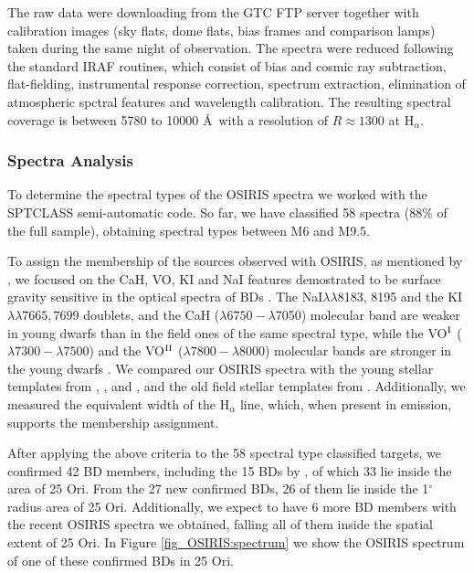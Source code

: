 \documentclass[12pt]{article}
\newcounter{subsubsubsection}[subsubsection]
\begin{document}
\label{sec_OSIRIS:reduction}
The raw data were downloading from the GTC FTP server together with calibration images (sky flats, dome flats, bias frames and comparison lamps) taken during the same night of observation. The spectra were reduced following the standard IRAF routines, which consist of bias and cosmic ray subtraction, flat-fielding, instrumental response correction, spectrum extraction, elimination of atmospheric spctral features and wavelength calibration. The resulting spectral coverage is between 5780 to 10000 \AA\ with a resolution of $R\approx1300$ at H$_\alpha$.

\subsubsection{Spectra Analysis}
\label{sec_OSIRIS:analysis}

\label{sec_OSIRIS:membership}
To determine the spectral types of the OSIRIS spectra we worked with the SPTCLASS semi-automatic code. So far, we have classified 58 spectra (88\%  of the full sample), obtaining spectral types between M6 and M9.5.

To assign the membership of the sources observed with OSIRIS, as mentioned by \citet{Downes2015}, we focused on the CaH, VO, KI and NaI features demostrated to be surface gravity sensitive in the optical spectra of BDs \citep{Martin1996}. The NaI$\lambda\lambda$8183, 8195 and the KI$\lambda\lambda7665, 7699$ doublets, and the CaH ($\lambda6750-\lambda$7050) molecular band are weaker in young dwarfs than in the field ones of the same spectral type, while the VO$^{\textrm{\scriptsize{I}}}$ ($\lambda7300-\lambda7500$) and the VO$^{\textrm{\scriptsize{II}}}$ ($\lambda7800-\lambda8000$) molecular bands are stronger in the young dwarfs \citep{McGovern2004}. We compared our OSIRIS spectra with the young stellar templates from \citet{Luhman2000}, \citet{Briceno2002}, \citet{Luhman2003b} and \citet{Luhman2004}, and the old field stellar templates from \citet{Kirkpatrick1999}. Additionally, we measured the equivalent width of the H$_\alpha$ line, which, when present in emission, supports the membership assignment.

After applying the above criteria to the 58 spectral type classified targets, we confirmed 42 BD members, including the 15 BDs by \citet{Downes2015}, of which 33 lie inside the area of 25 Ori. From the 27 new confirmed BDs, 26 of them lie inside the 1$^\circ$ radius area of 25 Ori. Additionally, we expect to have 6 more BD members with the recent OSIRIS spectra we obtained, falling all of them inside the spatial extent of 25 Ori. In Figure \ref{fig_OSIRIS:spectrum} we show the OSIRIS spectrum of one of these confirmed BDs in 25 Ori.
\end{document}
